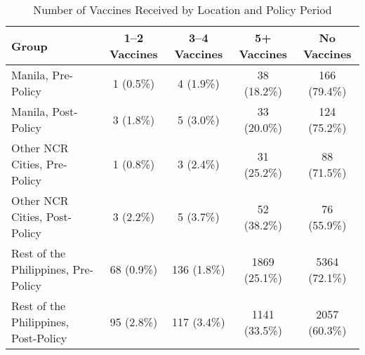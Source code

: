 \begin{table}[!h]
\centering
\caption{Number of Vaccines Received by Location and Policy Period}
\centering
\begin{tabular}[t]{lcccc}
\toprule
Group & 1–2 Vaccines & 3–4 Vaccines & 5+ Vaccines & No Vaccines\\
\midrule
Manila, Pre-Policy & 1 (0.5\%) & 4 (1.9\%) & 38 (18.2\%) & 166 (79.4\%)\\
Manila, Post-Policy & 3 (1.8\%) & 5 (3.0\%) & 33 (20.0\%) & 124 (75.2\%)\\
Other NCR Cities, Pre-Policy & 1 (0.8\%) & 3 (2.4\%) & 31 (25.2\%) & 88 (71.5\%)\\
Other NCR Cities, Post-Policy & 3 (2.2\%) & 5 (3.7\%) & 52 (38.2\%) & 76 (55.9\%)\\
Rest of the Philippines, Pre-Policy & 68 (0.9\%) & 136 (1.8\%) & 1869 (25.1\%) & 5364 (72.1\%)\\
\addlinespace
Rest of the Philippines, Post-Policy & 95 (2.8\%) & 117 (3.4\%) & 1141 (33.5\%) & 2057 (60.3\%)\\
\bottomrule
\end{tabular}
\end{table}
